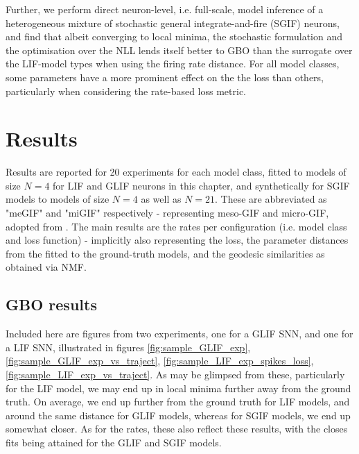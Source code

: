 \documentclass[mphil,deptreport,ianc]{infthesis} %
\begin{document}
Further, we perform direct neuron-level, i.e. full-scale, model inference of a heterogeneous mixture of stochastic general integrate-and-fire (SGIF) neurons, and find that albeit converging to local minima, the stochastic formulation and the optimisation over the NLL lends itself better to GBO than the surrogate over the LIF-model types when using the firing rate distance.
For all model classes, some parameters have a more prominent effect on the the loss than others, particularly when considering the rate-based loss metric. 


\section{Results}

Results are reported for 20 experiments for each model class, fitted to models of size $N=4$ for LIF and GLIF neurons in this chapter, and synthetically for SGIF models to models of size $N=4$ as well as $N=21$.
These are abbreviated as "meGIF" and "miGIF" respectively - representing meso-GIF and micro-GIF, adopted from \cite{Rene2020}.
The main results are the rates per configuration (i.e. model class and loss function) - implicitly also representing the loss, the parameter distances from the fitted to the ground-truth models, and the geodesic similarities as obtained via NMF.

\subsection{GBO results}


Included here are figures from two experiments, one for a GLIF SNN, and one for a LIF SNN, illustrated in figures \ref{fig:sample_GLIF_exp}, \ref{fig:sample_GLIF_exp_vs_traject}, \ref{fig:sample_LIF_exp_spikes_loss}, \ref{fig:sample_LIF_exp_vs_traject}.
As may be glimpsed from these, particularly for the LIF model, we may end up in local minima further away from the ground truth. On average, we end up further from the ground truth for LIF models, and around the same distance for GLIF models, whereas for SGIF models, we end up somewhat closer.
As for the rates, these also reflect these results, with the closes fits being attained for the GLIF and SGIF models.
\end{document}
